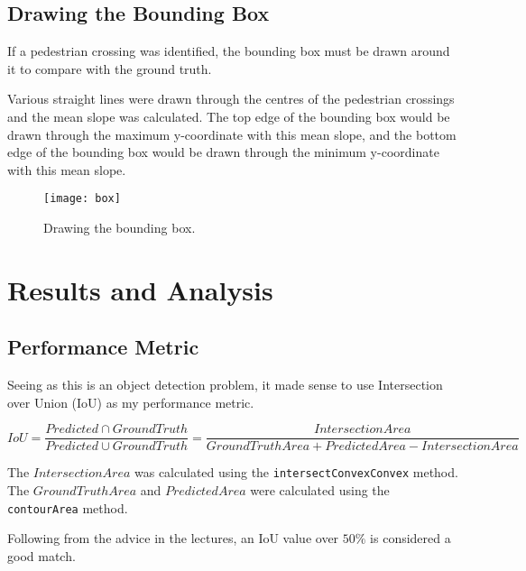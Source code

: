 \documentclass{article}  %
\begin{document}
	\subsection{Drawing the Bounding Box}
	
	If a pedestrian crossing was identified, the bounding box must be drawn around it to compare with the ground truth.
	
	Various straight lines were drawn through the centres of the pedestrian crossings and the mean slope was calculated. The top edge of the bounding box would be drawn through the maximum y-coordinate with this mean slope, and the bottom edge of the bounding box would be drawn through the minimum y-coordinate with this mean slope.
	
	\begin{figure}[H]
		\centering
		\texttt{[image: box]}
		\caption{Drawing the bounding box.}
	\end{figure}
	
	\newpage
	\section{Results and Analysis}
	
	\subsection*{Performance Metric}
	
	Seeing as this is an object detection problem, it made sense to use Intersection over Union (IoU) as my performance metric.
	
	\[ IoU = \frac{Predicted \cap Ground Truth}{Predicted \cup Ground Truth} = \frac{IntersectionArea}{GroundTruthArea + PredictedArea - IntersectionArea} \]
	
	The $IntersectionArea$ was calculated using the \verb|intersectConvexConvex| method. The $GroundTruthArea$ and $PredictedArea$ were calculated using the \verb|contourArea| method.
	
	Following from the advice in the lectures, an IoU value over $50\%$ is considered a good match.
	
\end{document}
